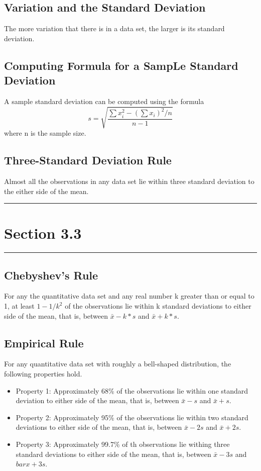 \documentclass[12pt]{article}
\begin{document}
        \subsection*{Variation and the Standard Deviation}
                The more variation that there is in a data set, the larger is its standard deviation.
        \subsection*{Computing Formula for a SampLe Standard Deviation}
            A sample standard deviation can be computed using the formula
            \begin{equation}
                s = \sqrt{\frac{\sum{x_i^2}-(\sum{x_i})^2/n}{n-1}}                     
            \end{equation}
            where n is the sample size.
        \subsection*{Three-Standard Deviation Rule}
            Almost all the observations in any data set lie within three standard deviation to the
            either side of the mean.

    \noindent\rule{\textwidth}{0.4pt}
    \section*{Section 3.3}
    \noindent\rule{\textwidth}{0.4pt}
        \subsection*{Chebyshev's Rule}
            For any the quantitative data set and any real number k greater than or equal to 1, at
            least \(1-1/k^2\) of the observations lie within k standard deviations to either side of
            the mean, that is, between \(\bar{x}-k*s\) and \(\bar{x}+k*s\).
        \subsection*{Empirical Rule}
        For any quantitative data set with roughly a bell-shaped distribution, the following
        properties hold.
        \begin{itemize}
            \item{Property 1:} Approximately 68\% of the observations lie within one standard 
            deviation to either side of the mean, that is, between \(\bar{x}-s\) and \(\bar{x}+s\).
            \item{Property 2:} Approximately 95\% of the observations lie within two standard
            deviations to either side of the mean, that is, between \(\bar{x}-2s\) and \(\bar{x}+2s\).
            \item{Property 3:} Approximately 99.7\% of th observations lie withing three standard
            deviations to either side of the mean, that is, between \(\bar{x}-3s\) and \(bar{x}+3s\).
        \end{itemize}
\end{document}
